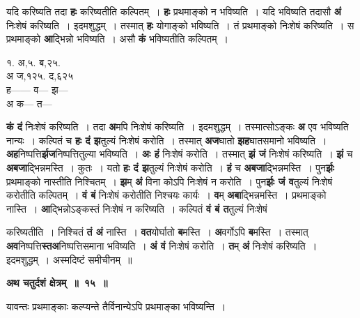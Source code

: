 \documentclass[11pt, openany]{book}
\begin{document}
\begin{flushleft}
\begin{minipage}[t]{0.65\textwidth}
\hspace{4mm} यदि करिष्यति तदा \textbf{हः} करिष्यतीति कल्पितम्~। \textbf{हः} प्रथमाङ्को न  भविष्यति~। यदि भविष्यति तदासौ \textbf{अं} निःशेषं करिष्यति~। इदमशुद्धम्~। तस्मात् \textbf{हः} योगाङ्को भविष्यति~। तं प्रथमाङ्को निःशेषं करिष्यति~। स प्रथमाङ्को \textbf{आ}द्भिन्नो भविष्यति~। असौ \textbf{कं} भविष्यतीति कल्पितम्~।
\end{minipage} 
\hfill
\begin{minipage}[t]{0.25\textwidth}
१. अ,५. ब,२५.\\
{\color{white}अ}  ज,१२५. द,६२५\\
ह------ व--- झ---\\
{\color{white}अ} क--- त---
\end{minipage}
\end{flushleft}
\vspace{-3mm}

\noindent \textbf{कं दं} निःशेषं करिष्यति~। तदा \textbf{अ}मपि निःशेषं करिष्यति~। इदमशुद्धम्~। तस्मात्सोऽङ्कः \textbf{अ} एव भविष्यति नान्यः~। कल्पितं च \textbf{हः दं झ}तुल्यं निःशेषं करोति~। तस्मात् \textbf{अज}घातो \textbf{झह}घातसमानो भविष्यति~। \textbf{अह}निष्पत्ति\textbf{र्झज}निष्पत्तितुल्या भविष्यति~। \textbf{अः हं} निःशेषं करोति~। तस्मात् \textbf{झं जं} निःशेषं करिष्यति~। \textbf{झं} च \textbf{अबजा}द्भिन्नमस्ति~। कुतः~। यतो \textbf{हः दं झ}तुल्यं निःशेषं करोति~। \textbf{हं} च \textbf{अबजा}द्भिन्नमस्ति~। पुन\textbf{र्झः} प्रथमाङ्को नास्तीति निश्चितम्~। \textbf{झ}म् \textbf{अं} विना कोऽपि निःशेषं न करोति~। पुन\textbf{र्झः जं व}तुल्यं निःशेषं करोतीति कल्पितम्~। \textbf{वं बं} निःशेषं करोतीति निश्चयः कार्यः~। \textbf{व}म् \textbf{अबा}द्भिन्नमस्ति~। प्रथमाङ्को नास्ति~। \textbf{आ}द्भिन्नोऽङ्कस्तं निःशेषं न करिष्यति~। कल्पितं \textbf{वं बं त}तुल्यं निःशेषं

\newpage
\noindent करिष्यतीति~। निश्चितं \textbf{तं अं} नास्ति~। \textbf{वत}योर्घातो \textbf{ब}मस्ति~। \textbf{अ}वर्गोऽपि \textbf{ब}मस्ति~। तस्मात् \textbf{अव}निष्पत्ति\textbf{स्तअ}निष्पत्तिसमाना भविष्यति~। \textbf{अं वं} निःशेषं करोति~। \textbf{त}म् \textbf{अं} निःशेषं करिष्यति~। इदमशुद्धम्~। अस्मदिष्टं समीचीनम्~॥ 
\vspace{2mm}

\begin{center}
\textbf{\large अथ चतुर्दशं क्षेत्रम्~॥~१५~॥}
\end{center}

{\ab यावन्तः प्रथमाङ्काः कल्प्यन्ते तैर्विनान्येऽपि प्रथमाङ्का भविष्यन्ति~। }
\end{document}

